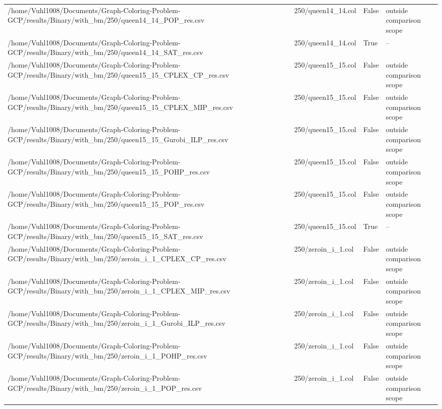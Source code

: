 \begin{table}[htbp]
\begin{tabular}{llll}
/home/Vuhl1008/Documents/Graph-Coloring-Problem-GCP/results/Binary/with\_bm/250/queen14\_14\_POP\_res.csv & 250/queen14\_14.col & False & outside comparison scope \\
/home/Vuhl1008/Documents/Graph-Coloring-Problem-GCP/results/Binary/with\_bm/250/queen14\_14\_SAT\_res.csv & 250/queen14\_14.col & True & -- \\
/home/Vuhl1008/Documents/Graph-Coloring-Problem-GCP/results/Binary/with\_bm/250/queen15\_15\_CPLEX\_CP\_res.csv & 250/queen15\_15.col & False & outside comparison scope \\
/home/Vuhl1008/Documents/Graph-Coloring-Problem-GCP/results/Binary/with\_bm/250/queen15\_15\_CPLEX\_MIP\_res.csv & 250/queen15\_15.col & False & outside comparison scope \\
/home/Vuhl1008/Documents/Graph-Coloring-Problem-GCP/results/Binary/with\_bm/250/queen15\_15\_Gurobi\_ILP\_res.csv & 250/queen15\_15.col & False & outside comparison scope \\
/home/Vuhl1008/Documents/Graph-Coloring-Problem-GCP/results/Binary/with\_bm/250/queen15\_15\_POHP\_res.csv & 250/queen15\_15.col & False & outside comparison scope \\
/home/Vuhl1008/Documents/Graph-Coloring-Problem-GCP/results/Binary/with\_bm/250/queen15\_15\_POP\_res.csv & 250/queen15\_15.col & False & outside comparison scope \\
/home/Vuhl1008/Documents/Graph-Coloring-Problem-GCP/results/Binary/with\_bm/250/queen15\_15\_SAT\_res.csv & 250/queen15\_15.col & True & -- \\
/home/Vuhl1008/Documents/Graph-Coloring-Problem-GCP/results/Binary/with\_bm/250/zeroin\_i\_1\_CPLEX\_CP\_res.csv & 250/zeroin\_i\_1.col & False & outside comparison scope \\
/home/Vuhl1008/Documents/Graph-Coloring-Problem-GCP/results/Binary/with\_bm/250/zeroin\_i\_1\_CPLEX\_MIP\_res.csv & 250/zeroin\_i\_1.col & False & outside comparison scope \\
/home/Vuhl1008/Documents/Graph-Coloring-Problem-GCP/results/Binary/with\_bm/250/zeroin\_i\_1\_Gurobi\_ILP\_res.csv & 250/zeroin\_i\_1.col & False & outside comparison scope \\
/home/Vuhl1008/Documents/Graph-Coloring-Problem-GCP/results/Binary/with\_bm/250/zeroin\_i\_1\_POHP\_res.csv & 250/zeroin\_i\_1.col & False & outside comparison scope \\
/home/Vuhl1008/Documents/Graph-Coloring-Problem-GCP/results/Binary/with\_bm/250/zeroin\_i\_1\_POP\_res.csv & 250/zeroin\_i\_1.col & False & outside comparison scope \\

\end{tabular}
\end{table}
